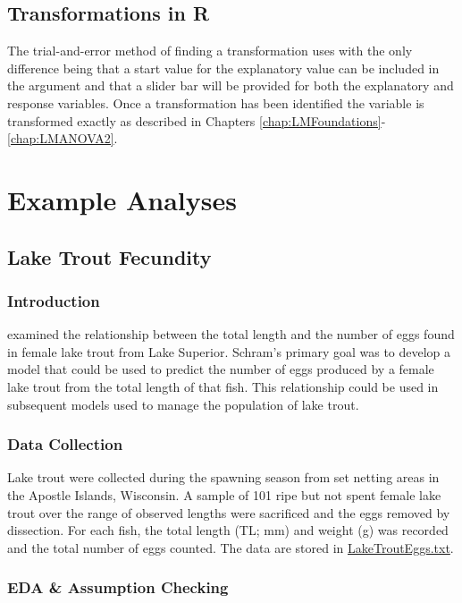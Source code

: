 \documentclass[10pt,openany]{book}\usepackage[]{graphicx}\usepackage[]{color}
\begin{document}
\subsection{Transformations in R}
The trial-and-error method of finding a transformation uses  with the only difference being that a start value for the explanatory value can be included in the  argument and that a slider bar will be provided for both the explanatory and response variables.  Once a transformation has been identified the variable is transformed exactly as described in Chapters \ref{chap:LMFoundations}-\ref{chap:LMANOVA2}.


\section{Example Analyses}
\subsection{Lake Trout Fecundity}
\subsubsection*{Introduction}
\cite{Schram1993} examined the relationship between the total length and the number of eggs found in female lake trout from Lake Superior.  Schram's primary goal was to develop a model that could be used to predict the number of eggs produced by a female lake trout from the total length of that fish.  This relationship could be used in subsequent models used to manage the population of lake trout.

\subsubsection*{Data Collection}
Lake trout were collected during the spawning season from set netting areas in the Apostle Islands, Wisconsin.  A sample of 101 ripe but not spent female lake trout over the range of observed lengths were sacrificed and the eggs removed by dissection.  For each fish, the total length (TL; mm) and weight (g) was recorded and the total number of eggs counted.  The data are stored in \href{"https://sites.google.com/site/ncstats/data/LakeTroutEggs.txt"}{LakeTroutEggs.txt}.

\subsubsection*{EDA \& Assumption Checking}
\end{document}
